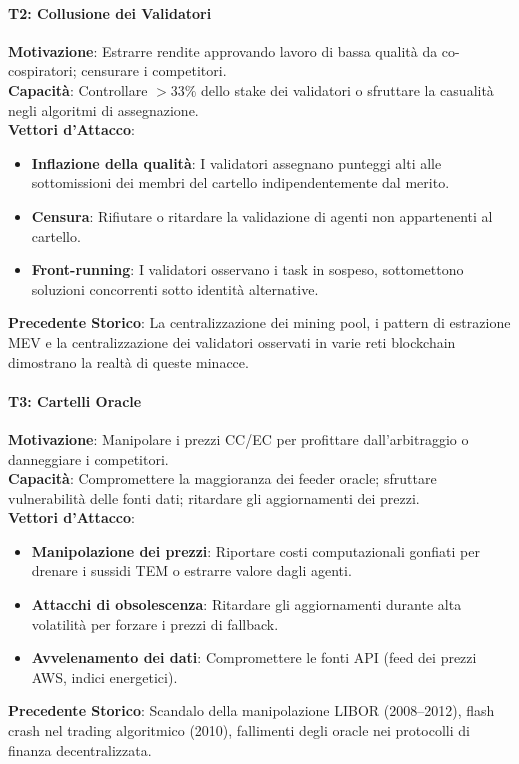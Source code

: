 \documentclass[11pt]{article}
\begin{document}
\begin{itemize}[noitemsep]
\paragraph{T2: Collusione dei Validatori}
\textbf{Motivazione}: Estrarre rendite approvando lavoro di bassa qualità da co-cospiratori; censurare i competitori.\\
\textbf{Capacità}: Controllare $>33\%$ dello stake dei validatori o sfruttare la casualità negli algoritmi di assegnazione.\\
\textbf{Vettori d'Attacco}:
\begin{itemize}[noitemsep]
  \item \textbf{Inflazione della qualità}: I validatori assegnano punteggi alti alle sottomissioni dei membri del cartello indipendentemente dal merito.
  \item \textbf{Censura}: Rifiutare o ritardare la validazione di agenti non appartenenti al cartello.
  \item \textbf{Front-running}: I validatori osservano i task in sospeso, sottomettono soluzioni concorrenti sotto identità alternative.
\end{itemize}
\textbf{Precedente Storico}: La centralizzazione dei mining pool, i pattern di estrazione MEV e la centralizzazione dei validatori osservati in varie reti blockchain dimostrano la realtà di queste minacce.

\paragraph{T3: Cartelli Oracle}
\textbf{Motivazione}: Manipolare i prezzi CC/EC per profittare dall'arbitraggio o danneggiare i competitori.\\
\textbf{Capacità}: Compromettere la maggioranza dei feeder oracle; sfruttare vulnerabilità delle fonti dati; ritardare gli aggiornamenti dei prezzi.\\
\textbf{Vettori d'Attacco}:
\begin{itemize}[noitemsep]
  \item \textbf{Manipolazione dei prezzi}: Riportare costi computazionali gonfiati per drenare i sussidi TEM o estrarre valore dagli agenti.
  \item \textbf{Attacchi di obsolescenza}: Ritardare gli aggiornamenti durante alta volatilità per forzare i prezzi di fallback.
  \item \textbf{Avvelenamento dei dati}: Compromettere le fonti API (feed dei prezzi AWS, indici energetici).
\end{itemize}
\textbf{Precedente Storico}: Scandalo della manipolazione LIBOR (2008--2012), flash crash nel trading algoritmico (2010), fallimenti degli oracle nei protocolli di finanza decentralizzata.


\end{itemize}
\end{document}
